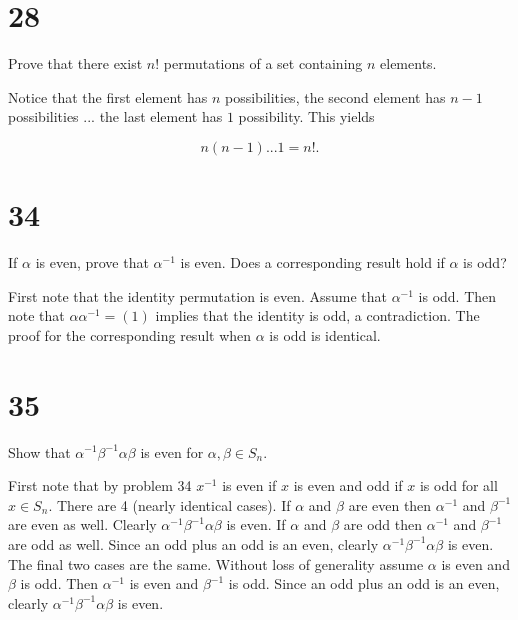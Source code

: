 \documentclass[a4paper]{article}
\begin{document}
\section*{28}

Prove that there exist $n!$ permutations of a set containing $n$ elements.

\vspace{\baselineskip}

Notice that the first element has $n$ possibilities, the second element  has $n-1$ possibilities ... the last element has $1$ possibility. This yields

$$n(n-1)...1 = n!.$$


\section*{34}

If $\alpha$ is even, prove that $\alpha^{-1}$ is even. Does a corresponding result hold if $\alpha$ is odd?

\vspace{\baselineskip}

First note that the identity permutation is even. Assume that $\alpha^{-1}$ is odd. Then note that $\alpha \alpha^{-1} = (1)$ implies that the identity is odd, a contradiction. The proof for the corresponding result when $\alpha$ is odd is identical.


\section*{35}

Show that $\alpha^{-1} \beta^{-1} \alpha \beta$ is even for $\alpha, \beta \in S_n$.

\vspace{\baselineskip}

First note that by problem 34 $x^{-1}$ is even if $x$ is even and odd if $x$ is odd for all $x \in S_n$. There are 4 (nearly identical cases). If $\alpha$ and $\beta$ are even then $\alpha^{-1}$ and $\beta^{-1}$ are even as well. Clearly $\alpha^{-1} \beta^{-1} \alpha \beta$ is even. If $\alpha$ and $\beta$ are odd then $\alpha^{-1}$ and $\beta^{-1}$ are odd as well. Since an odd plus an odd is an even, clearly $\alpha^{-1} \beta^{-1} \alpha \beta$ is even. The final two cases are the same. Without loss of generality assume $\alpha$ is even and $\beta$ is odd. Then $\alpha^{-1}$ is even and $\beta^{-1}$ is odd. Since an odd plus an odd is an even, clearly $\alpha^{-1} \beta^{-1} \alpha \beta$ is even.
\end{document}
